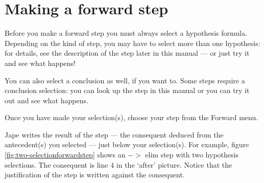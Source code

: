 \documentclass[11pt]{book}
\newcommand{\figref}[1]{figure \ref{fig:#1}}
\begin{document}
\section{Making a forward step}

Before you make a forward step you must always select a hypothesis formula. Depending on the kind of step, you may have to select more than one hypothesis: for details, see the description of the step later in this manual --- or just try it and see what happens!

You can also select a conclusion as well, if you want to. Some steps require a conclusion selection: you can look up the step in this manual or you can try it out and see what happens. 

Once you have made your selection(s), choose your step from the Forward menu.

Jape writes the result of the step --- the consequent deduced from the antecedent(s) you selected --- just below your selection(s). For example, \figref{two-selectionforwardstep} shows an $->$ elim step with two hypothesis selections. The consequent is line 4 in the `after' picture. Notice that the justification of the step is written against the consequent.
\end{document}
